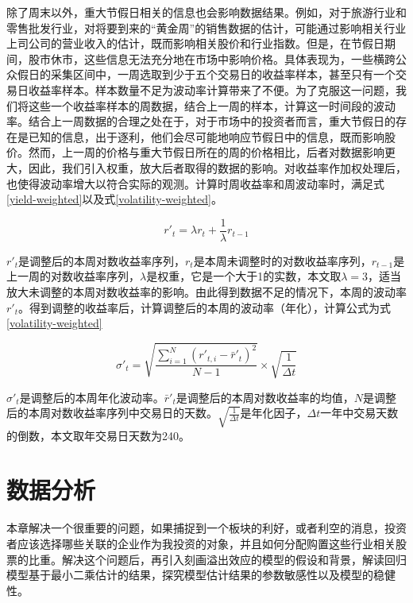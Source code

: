 \documentclass{sysuthesis}
\begin{document}
除了周末以外，重大节假日相关的信息也会影响数据结果。例如，对于旅游行业和零售批发行业，对将要到来的“黄金周”的销售数据的估计，可能通过影响相关行业上司公司的营业收入的估计，既而影响相关股价和行业指数。但是，在节假日期间，股市休市，这些信息无法充分地在市场中影响价格。具体表现为，一些横跨公众假日的采集区间中，一周选取到少于五个交易日的收益率样本，甚至只有一个交易日收益率样本。样本数量不足为波动率计算带来了不便。为了克服这一问题，我们将这些一个收益率样本的周数据，结合上一周的样本，计算这一时间段的波动率。结合上一周数据的合理之处在于，对于市场中的投资者而言，重大节假日的存在是已知的信息，出于逐利，他们会尽可能地响应节假日中的信息，既而影响股价。然而，上一周的价格与重大节假日所在的周的价格相比，后者对数据影响更大，因此，我们引入权重，放大后者取得的数据的影响。对收益率作加权处理后，也使得波动率增大以符合实际的观测。计算时周收益率和周波动率时，满足式\ref{yield-weighted}以及式\ref{volatility-weighted}。

\begin{equation}
\label{yield-weighted} 
{r'_t} = \lambda {r_t} + \frac{1}{\lambda }{r_{t-1}}
\end{equation}

${r'_t}$是调整后的本周对数收益率序列，${r_t}$是本周未调整时的对数收益率序列，${r_{t - 1}}$是上一周的对数收益率序列，$\lambda$是权重，它是一个大于1的实数，本文取$\lambda=3$，适当放大未调整的本周对数收益率的影响。由此得到数据不足的情况下，本周的波动率${r'_t}$。得到调整的收益率后，计算调整后的本周的波动率（年化），计算公式为式\ref{volatility-weighted}

\begin{equation}
\label{volatility-weighted} 
{\sigma '_t} = \sqrt {\frac{{\sum\limits_{i = 1}^N {{{({{r'}_{t,i}} - {{\bar r'}_t})}^2}} }}{{N - 1}}}  \times \sqrt {\frac{1}{{\Delta t}}}
\end{equation}

${\sigma '_t}$是调整后的本周年化波动率。${{\bar r'}_t}$是调整后的本周对数收益率的均值，$N$是调整后的本周对数收益率序列中交易日的天数。$\sqrt {\frac{1}{{\Delta t}}}$是年化因子，${\Delta t}$一年中交易天数的倒数，本文取年交易日天数为240。

\chapter{数据分析}

本章解决一个很重要的问题，如果捕捉到一个板块的利好，或者利空的消息，投资者应该选择哪些关联的企业作为我投资的对象，并且如何分配购置这些行业相关股票的比重。解决这个问题后，再引入刻画溢出效应的模型的假设和背景，解读回归模型基于最小二乘估计的结果，探究模型估计结果的参数敏感性以及模型的稳健性。
\end{document}
